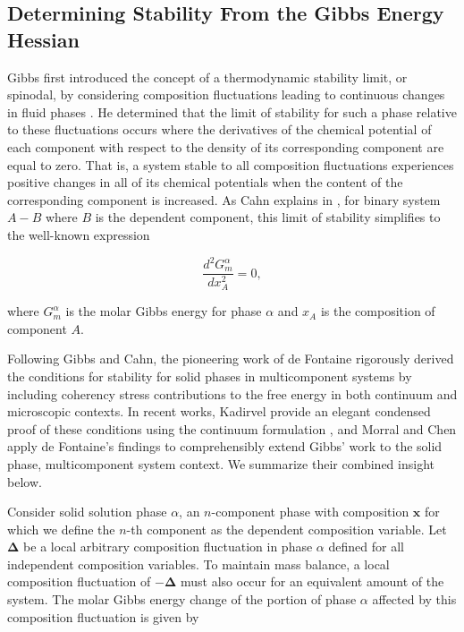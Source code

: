 \subsection{Determining Stability From the Gibbs Energy Hessian}
\label{sec:stability_theory}

Gibbs first introduced the concept of a thermodynamic stability limit, or spinodal, by considering composition fluctuations leading to continuous changes in fluid phases \cite{gibbs1878equilibrium}. He determined that the limit of stability for such a phase relative to these fluctuations occurs where the derivatives of the chemical potential of each component with respect to the density of its corresponding component are equal to zero. That is, a system stable to all composition fluctuations experiences positive changes in all of its chemical potentials when the content of the corresponding component is increased. As Cahn explains in \cite{cahn1961spinodal}, for binary system $A-B$ where $B$ is the dependent component, this limit of stability simplifies to the well-known expression

\begin{equation}\label{second_der_G}
    \frac{d^2G^\alpha_m}{dx^2_A}=0,
\end{equation}

\noindent where $G^\alpha_m$ is the molar Gibbs energy for phase $\alpha$ and $x_A$ is the composition of component $A$. 

Following Gibbs and Cahn, the pioneering work of de Fontaine rigorously derived the conditions for stability for solid phases in multicomponent systems by including coherency stress contributions to the free energy in both continuum \cite{de1967computer} and microscopic \cite{de1972analysis} contexts. In recent works, Kadirvel \etal provide an elegant condensed proof of these conditions using the continuum formulation \cite{kadirvel2022exploration}, and Morral and Chen apply de Fontaine's findings to comprehensibly extend Gibbs' work to the solid phase, multicomponent system context. We summarize their combined insight below.

Consider solid solution phase $\alpha$, an $n$-component phase with composition $\boldsymbol{x}$ for which we define the $n$-th component as the dependent composition variable. Let $\boldsymbol{\Delta}$ be a local arbitrary composition fluctuation in phase $\alpha$ defined for all independent composition variables. To maintain mass balance, a local composition fluctuation of $-\boldsymbol{\Delta}$ must also occur for an equivalent amount of the system. The molar Gibbs energy change of the portion of phase $\alpha$ affected by this composition fluctuation is given by

